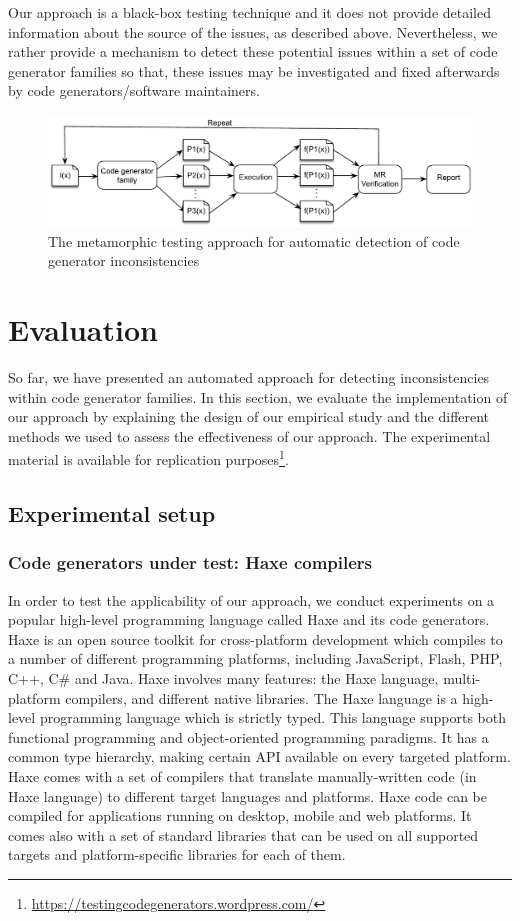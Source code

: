 Our approach is a black-box testing technique and it does not provide detailed information about the source of the issues, as described above. Nevertheless, we rather provide a mechanism to detect these potential issues within a set of code generator families so that, these issues may be investigated and fixed afterwards by code generators/software maintainers.


\begin{figure}[h]
	\centering
	\includegraphics[width=1.\linewidth]{chapitre4/fig/MT}
	\caption{The metamorphic testing approach for automatic detection of code generator inconsistencies}
	\label{fig:cg_MT}
\end{figure}




\section{Evaluation}
\label{sec:cg_evaluation}
So far, we have presented an automated approach for detecting inconsistencies within code generator families. In this section, we evaluate the implementation of our approach by explaining the design of our empirical study and the different methods we used to assess the effectiveness of our approach. 
The experimental material is available for replication purposes\footnote{\url{https://testingcodegenerators.wordpress.com/}}.
\subsection{Experimental setup}
\subsubsection{Code generators under test: Haxe compilers}
In order to test the applicability of our approach, we conduct experiments on a popular high-level programming language called Haxe and its code generators. Haxe is an open source toolkit for cross-platform development which compiles to a number of different programming platforms, including JavaScript, Flash, PHP, C++, C\# and Java. Haxe involves many features: the Haxe language, multi-platform compilers, and different native libraries. 
The Haxe language is a high-level programming language which is strictly typed. This language supports both functional programming and object-oriented programming paradigms. It has a common type hierarchy, making certain API available on every targeted platform.
Haxe comes with a set of compilers that translate manually-written code (in Haxe language) to different target languages and platforms. 
Haxe code can be compiled for applications running on desktop, mobile and web platforms. It comes also with a set of standard libraries that can be used on all supported targets and platform-specific libraries for each of them.

